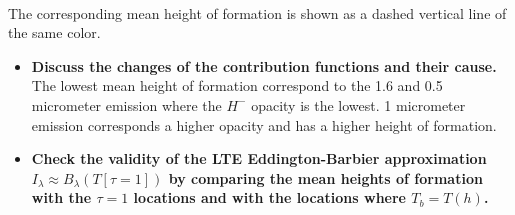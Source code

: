 \documentclass{article}
\providecommand{\tightlist}{%
      \setlength{\itemsep}{0pt}\setlength{\parskip}{0pt}}
\begin{document}
    \begin{center}
    \end{center}
    { \hspace*{\fill} \\}
    
    The corresponding mean height of formation is shown as a dashed vertical
line of the same color.

\begin{itemize}
\tightlist
\item
  \textbf{Discuss the changes of the contribution functions and their
  cause.} The lowest mean height of formation correspond to the 1.6 and
  0.5 micrometer emission where the \(H^-\) opacity is the lowest. 1
  micrometer emission corresponds a higher opacity and has a higher
  height of formation.
\end{itemize}

    \begin{itemize}
\tightlist
\item
  \textbf{Check the validity of the LTE Eddington-Barbier approximation
  \(I_{\lambda} \approx B_{\lambda}(T[\tau = 1])\) by comparing the mean
  heights of formation with the \(\tau = 1\) locations and with the
  locations where \(T_b = T(h)\).}
\end{itemize}
\end{document}

